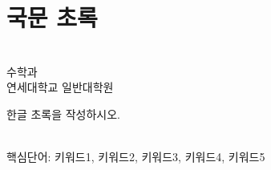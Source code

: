
{\fontsize{11pt}{18pt}
 \selectfont

\chapter*{\textnormal{국문 초록}}

\begin{center}
{\LARGE
\txtTitleKorean
}
\end{center}
\begin{flushright}
\parbox[t]{0.9\textwidth}
{\begin{flushright}
\txtAuthorKorean\\
수학과\\
연세대학교 일반대학원
\end{flushright}}
\end{flushright}
\vspace{1em}

한글 초록을 작성하시오. 

 \noindent
\hrulefill\\
{ 
    핵심단어: 키워드1, 키워드2, 키워드3, 키워드4, 키워드5}
}
